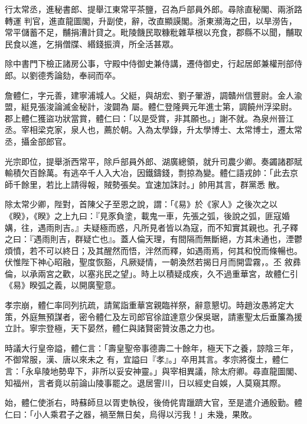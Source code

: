 \begin{pinyinscope}
 行太常丞，進秘書郎、提舉江東常平茶鹽，召為戶部員外郎。尋除直秘閣、兩浙路轉運
 判官，進直龍圖閣，升副使，辭，改直顯謨閣。浙東瀕海之田，以旱澇告，常平儲蓄不足，黼捐漕計貸之。毗陵饑民取糠粃雜草根以充食，郡縣不以聞，黼取民食以進，乞捐僧牒、緡錢振濟，所全活甚眾。



 除中書門下檢正諸房公事，守殿中侍御史兼侍講，遷侍御史，行起居郎兼權刑部侍郎。以劉德秀論劾，奉祠而卒。



 詹體仁，字元善，建寧浦城人。父綎，與胡宏、劉子翬游，調贛州信豐尉。金人渝盟，綎見張浚論滅金秘計，浚闢為
 屬。體仁登隆興元年進士第，調饒州浮梁尉。郡上體仁獲盜功狀當賞，體仁曰：「以是受賞，非其願也。」謝不就。為泉州晉江丞。宰相梁克家，泉人也，薦於朝。入為太學錄，升太學博士、太常博士，遷太常丞，攝金部郎官。



 光宗即位，提舉浙西常平，除戶部員外郎、湖廣總領，就升司農少卿。奏蠲諸郡賦輸積欠百餘萬。有逃卒千人入大冶，因鐵鑄錢，剽掠為變。體仁語戎帥：「此去京師千餘里，若比上請得報，賊勢張矣。宜速加誅討。」帥用其言，群黨悉
 散。



 除太常少卿，陛對，首陳父子至恩之說，謂：「《易》於《家人》之後次之以《睽》，《睽》之上九曰：『見豕負塗，載鬼一車，先張之弧，後說之弧，匪寇婚媾，往，遇雨則吉。』夫疑極而惑，凡所見者皆以為寇，而不知實其親也。孔子釋之曰：『遇雨則吉，群疑亡也』。蓋人倫天理，有間隔而無斷絕，方其未通也，湮鬱煩憤，若不可以終日；及其醒然而悟，泮然而釋，如遇雨焉，何其和悅而條暢也。伏惟陛下神心昭融，聖度恢豁，凡厥疑情，一朝渙然若揭日月而開雲霧，。丕
 敘彞倫，以承兩宮之歡，以塞兆民之望」。時上以積疑成疾，久不過重華宮，故體仁引《易》睽弧之義，以開廣聖意。



 孝宗崩，體仁率同列抗疏，請駕詣重華宮親臨祥祭，辭意懇切。時趙汝愚將定大策，外庭無預謀者，密令體仁及左司郎官徐誼達意少保吳琚，請憲聖太后垂簾為援立計。寧宗登極，天下晏然，體仁與諸賢密贊汝愚之力也。



 時議大行皇帝謚，體仁言：「壽皇聖帝事德壽二十餘年，極天下之養，諒陰三年，不御常服，漢、唐以來未之
 有，宜謚曰『孝』。」卒用其言。孝宗將復土，體仁言：「永阜陵地勢卑下，非所以妥安神靈。」與宰相異議，除太府卿。尋直龍圖閣、知福州，言者竟以前論山陵事罷之。退居霅川，日以經史自娛，人莫窺其際。



 始，體仁使浙右，時蘇師旦以胥吏執役，後倚侂胄躐躋大官，至是遣介通殷勤。體仁曰：「小人乘君子之器，禍至無日矣，烏得以污我！」未幾，果敗。




\end{pinyinscope}

